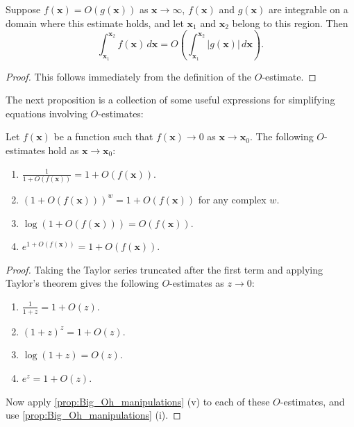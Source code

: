       \begin{proposition}
        Suppose $f(\mathbf{x}) = O(g(\mathbf{x}))$ as $\mathbf{x} \to \infty$, $f(\mathbf{x})$ and $g(\mathbf{x})$ are integrable on a domain where this estimate holds, and let $\mathbf{x}_{1}$ and $\mathbf{x}_{2}$ belong to this region. Then
        \[
          \int_{\mathbf{x}_{1}}^{\mathbf{x}_{2}}f(\mathbf{x})\,d\mathbf{x} = O\left(\int_{\mathbf{x}_{1}}^{\mathbf{x}_{2}}|g(\mathbf{x})|\,d\mathbf{x}\right).
        \]
      \end{proposition}
      \begin{proof}
        This follows immediately from the definition of the $O$-estimate.
      \end{proof}

      The next proposition is a collection of some useful expressions for simplifying equations involving $O$-estimates:

      \begin{proposition}
        Let $f(\mathbf{x})$ be a function such that $f(\mathbf{x}) \to 0$ as $\mathbf{x} \to \mathbf{x}_{0}$. The following $O$-estimates hold as $\mathbf{x} \to \mathbf{x}_{0}$:
        \begin{enumerate}[label=(\roman*)]
          \item $\frac{1}{1+O(f(\mathbf{x}))} = 1+O(f(\mathbf{x}))$.
          \item $(1+O(f(\mathbf{x})))^{w} = 1+O(f(\mathbf{x}))$ for any complex $w$.
          \item $\log(1+O(f(\mathbf{x}))) = O(f(\mathbf{x}))$.
          \item $e^{1+O(f(\mathbf{x}))} = 1+O(f(\mathbf{x}))$.
        \end{enumerate}
      \end{proposition}
      \begin{proof}
        Taking the Taylor series truncated after the first term and applying Taylor's theorem gives the following $O$-estimates as $z \to 0$:
        \begin{enumerate}[label=(\roman*)]
          \item $\frac{1}{1+z} = 1+O(z)$.
          \item $(1+z)^{z} = 1+O(z)$.
          \item $\log(1+z) = O(z)$.
          \item $e^{z} = 1+O(z)$.
        \end{enumerate}
        Now apply \cref{prop:Big_Oh_manipulations} (v) to each of these $O$-estimates, and use \cref{prop:Big_Oh_manipulations} (i).
      \end{proof}

